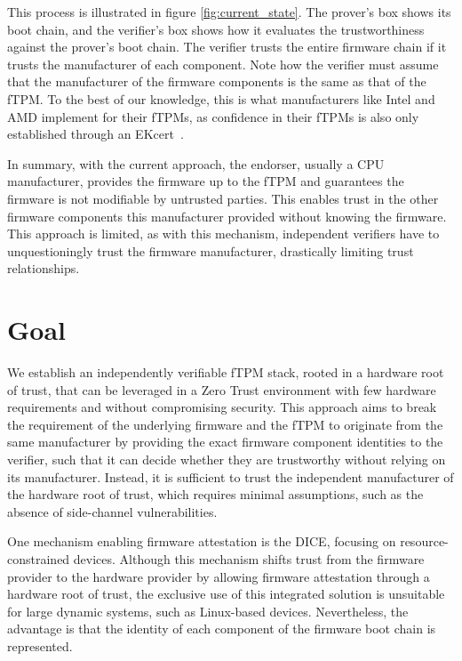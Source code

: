 

This process is illustrated in figure \autoref{fig:current_state}.
The prover's box shows its boot chain, and the verifier's box shows how it evaluates the trustworthiness against the prover's boot chain.
The verifier trusts the entire firmware chain if it trusts the manufacturer of each component.
Note how the verifier must assume that the manufacturer of the firmware components is the same as that of the fTPM\@.
To the best of our knowledge, this is what manufacturers like Intel and AMD implement for their \acp{fTPM}, as confidence in their \acp{fTPM} is also only established through an EKcert~\cite{Ruan2014}.


In summary, with the current approach, the endorser, usually a CPU manufacturer, provides the firmware up to the fTPM and guarantees the firmware is not modifiable by untrusted parties.
This enables trust in the other firmware components this manufacturer provided without knowing the firmware.
This approach is limited, as with this mechanism, independent verifiers have to unquestioningly trust the firmware manufacturer, drastically limiting trust relationships.

\section{Goal}\label{sec:goal}

We establish an independently verifiable fTPM stack, rooted in a hardware root of trust, that can be leveraged in a Zero Trust environment with few hardware requirements and without compromising security.
This approach aims to break the requirement of the underlying firmware and the fTPM to originate from the same manufacturer by providing the exact firmware component identities to the verifier, such that it can decide whether they are trustworthy without relying on its manufacturer.
Instead, it is sufficient to trust the independent manufacturer of the hardware root of trust, which requires minimal assumptions, such as the absence of side-channel vulnerabilities.


One mechanism enabling firmware attestation is the \ac{DICE}, focusing on resource-constrained devices.
Although this mechanism shifts trust from the firmware provider to the hardware provider by allowing firmware attestation through a hardware root of trust, the exclusive use of this integrated solution is unsuitable for large dynamic systems, such as Linux-based devices.
Nevertheless, the advantage is that the identity of each component of the firmware boot chain is represented.

